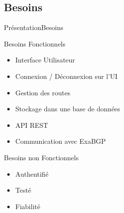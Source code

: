 \subsection{Besoins}

\begin{frame}{Présentation}{Besoins}
\begin{block}{Besoins Fonctionnels}
\begin{itemize}
	\item Interface Utilisateur
    \item Connexion / Déconnexion sur l'UI
	\item Gestion des routes
	\item Stockage dans une base de données
	\item API REST
	\item Communication avec ExaBGP
\end{itemize}
\end{block}

\begin{exampleblock}{Besoins non Fonctionnels}
\begin{itemize}
	\item Authentifié
	\item Testé
	\item Fiabilité
\end{itemize}
\end{exampleblock}
\end{frame}